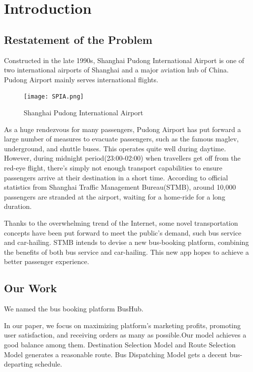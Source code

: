 \documentclass{mcmthesis}
\begin{document}
\maketitle
\tableofcontents
\newpage

\section{Introduction}
\subsection{Restatement of the Problem}
Constructed in the late 1990s, Shanghai Pudong International Airport is one of two international airports of Shanghai and a major aviation hub of China. Pudong Airport mainly serves international flights.

\begin{figure}[h]
    \centering
    \texttt{[image: SPIA.png]}
    \caption{Shanghai Pudong International Airport \cite{Google_SPIA}}
    \label{fig:SPIA}
\end{figure}

As a huge rendezvous for many passengers, Pudong Airport has put forward a large number of measures to evacuate passengers, such as the famous maglev, underground, and shuttle buses. This operates quite well during daytime. However, during midnight period(23:00-02:00) when travellers get off from the red-eye flight, there's simply not enough transport capabilities to ensure passengers arrive at their destination in a short time. According to official statistics from Shanghai Traffic Management Bureau(STMB), around 10,000 passengers are stranded at the airport, waiting for a home-ride for a long duration.

Thanks to the overwhelming trend of the Internet, some novel transportation concepts have been put forward to meet the public's demand, such bus service and car-hailing. STMB intends to devise a new bus-booking platform, combining the benefits of both bus service and car-hailing. This new app hopes to achieve a better passenger experience.

\subsection{Our Work}

We named the bus booking platform BusHub.

In our paper, we focus on maximizing platform's marketing profits, promoting user satisfaction, and receiving orders as many as possible.Our model achieves a good balance among them. Destination Selection Model and Route Selection Model generates a reasonable route. Bus Dispatching Model gets a decent bus-departing schedule. 
\end{document}

